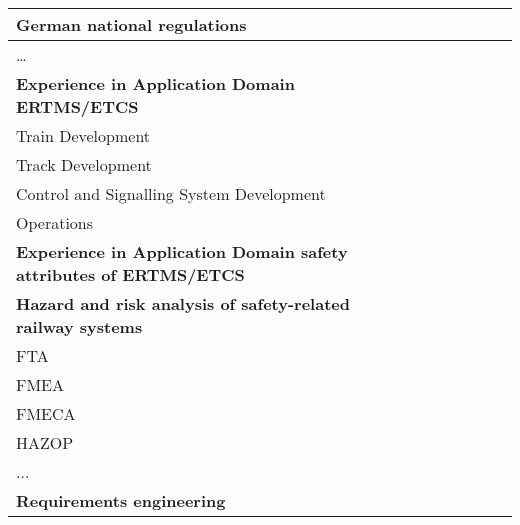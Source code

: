 \documentclass[a4paper, 11pt]{article}
\begin{document}
\begin{center}
\begin{longtable}{|r|r|r|r|r|r|r|r|}
    \hline
    \multicolumn{1}{|l|}{German national regulations} & \multicolumn{1}{c|}{} &       &       &       &       &       &  \bigstrut\\
    \hline
    \multicolumn{1}{|l|}{…} & \multicolumn{1}{c|}{} &       &       &       &       &       &  \bigstrut[t]\\
    \multicolumn{1}{|l|}{\textbf{Experience in Application Domain ERTMS/ETCS}} & \multicolumn{1}{c|}{\textbf{}} &       &       &       &       &       &  \\
    \multicolumn{1}{|l|}{Train Development} & \multicolumn{1}{c|}{} &       &       &       &       &       &  \bigstrut[b]\\
    \hline
    \multicolumn{1}{|l|}{Track Development} & \multicolumn{1}{c|}{} &       &       &       &       &       &  \bigstrut\\
    \hline
    \multicolumn{1}{|l|}{Control and Signalling System Development} & \multicolumn{1}{c|}{} &       &       &       &       &       &  \bigstrut\\
    \hline
    \multicolumn{1}{|l|}{Operations} & \multicolumn{1}{c|}{} &       &       &       &       &       &  \bigstrut[t]\\
    \multicolumn{1}{|l|}{\textbf{Experience in Application Domain safety attributes of ERTMS/ETCS}} & \multicolumn{1}{c|}{\textbf{}} &       &       &       &       &       &  \\
    \multicolumn{1}{|l|}{\textbf{Hazard and risk analysis of safety-related railway systems}} & \multicolumn{1}{c|}{\textbf{}} &       &       &       &       &       &  \\
    \multicolumn{1}{|l|}{FTA } & \multicolumn{1}{c|}{} &       &       &       &       &       &  \bigstrut[b]\\
    \hline
    \multicolumn{1}{|l|}{FMEA} & \multicolumn{1}{c|}{} &       &       &       &       &       &  \bigstrut\\
    \hline
    \multicolumn{1}{|l|}{FMECA} & \multicolumn{1}{c|}{} &       &       &       &       &       &  \bigstrut\\
    \hline
    \multicolumn{1}{|l|}{HAZOP} & \multicolumn{1}{c|}{} &       &       &       &       &       &  \bigstrut\\
    \hline
    \multicolumn{1}{|l|}{...} & \multicolumn{1}{c|}{} &       &       &       &       &       &  \bigstrut[t]\\
    \multicolumn{1}{|l|}{\textbf{Requirements engineering}} & \multicolumn{1}{l|}{\textbf{}} &       &       &       &       &       &  \\

\end{longtable}
\end{center}
\end{document}
